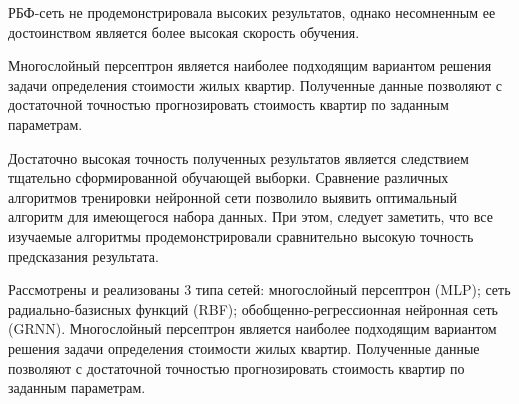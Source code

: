 РБФ-сеть не продемонстрировала высоких результатов, однако несомненным ее достоинством является более высокая скорость
обучения.

Многослойный персептрон является наиболее подходящим вариантом решения задачи определения стоимости жилых квартир.
Полученные данные позволяют с достаточной точностью прогнозировать стоимость квартир по заданным параметрам.

Достаточно высокая точность полученных результатов является следствием тщательно сформированной обучающей выборки.
Сравнение различных алгоритмов тренировки нейронной сети позволило выявить оптимальный алгоритм для имеющегося набора
данных. При этом, следует заметить, что все изучаемые алгоритмы продемонстрировали сравнительно высокую точность
предсказания результата.

Рассмотрены и реализованы 3 типа сетей: многослойный персептрон (MLP); сеть радиально-базисных функций (RBF);
обобщенно-регрессионная нейронная сеть (GRNN). Многослойный персептрон является наиболее подходящим вариантом решения
задачи определения стоимости жилых квартир. Полученные данные позволяют с достаточной точностью прогнозировать
стоимость квартир по заданным параметрам.
